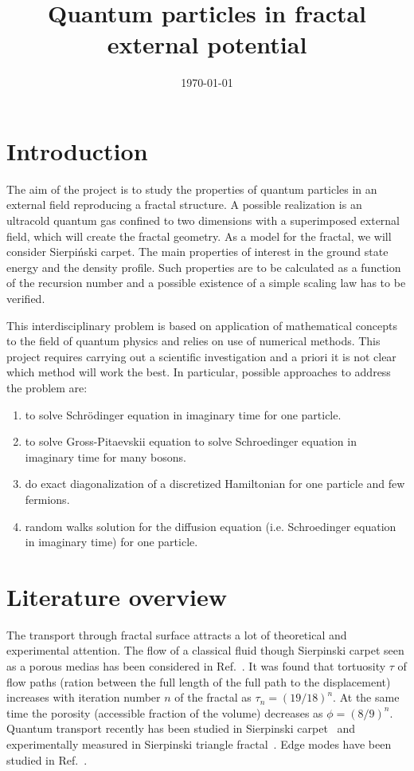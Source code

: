 \documentclass[aps,prl,reprint,onecolumn,superscriptaddress,floatfix,longbibliography]{revtex4-2}
\title{Quantum particles in fractal external potential}
\date{\today}
\begin{document}
\maketitle

\section{Introduction}
The aim of the project is to study the properties of quantum particles in an external field reproducing a fractal structure. A possible realization is an ultracold quantum gas confined to two dimensions with a superimposed external field, which will create the fractal geometry. As a model for the fractal, we will consider Sierpiński carpet. The main properties of interest in the ground state energy and the density profile. Such properties are to be calculated as a function of the recursion number and a possible existence of a simple scaling law has to be verified. 
%
%

This interdisciplinary problem is based on application of mathematical concepts to the field of quantum physics and relies on use of numerical methods. This project requires carrying out a scientific investigation and a priori it is not clear which method will work the best. In particular, possible  approaches to address the problem are:
\begin{enumerate}
  \item to solve Schrödinger equation in imaginary time for one particle.
  \item to solve Gross-Pitaevskii equation to solve Schroedinger equation in imaginary time for many bosons.
  \item do exact diagonalization of a discretized Hamiltonian for one particle and few fermions.
  \item random walks solution for the diffusion equation (i.e. Schroedinger equation in imaginary time) for one particle.
\end{enumerate}

\section{Literature overview}

\cite{Sierpinski1916}

The transport through fractal surface attracts a lot of theoretical and experimental attention. 
The flow of a classical fluid though Sierpinski carpet seen as a porous medias has been considered in Ref.~\cite{Li2011}. 
It was found that tortuosity $\tau$ of flow paths (ration between the full length of the full path to the displacement) increases with iteration number $n$ of the fractal as $\tau_n = (19/18)^n$. 
At the same time the porosity (accessible fraction of the volume) decreases as $\phi = (8/9)^n$.
Quantum transport recently has been studied in Sierpinski carpet~\cite{vanVeen2016} and experimentally measured in Sierpinski triangle fractal~\cite{Kempkes2018}.
Edge modes have been studied in Ref.~\cite{Fremling2020,fischer2021robustness}.
\end{document}
